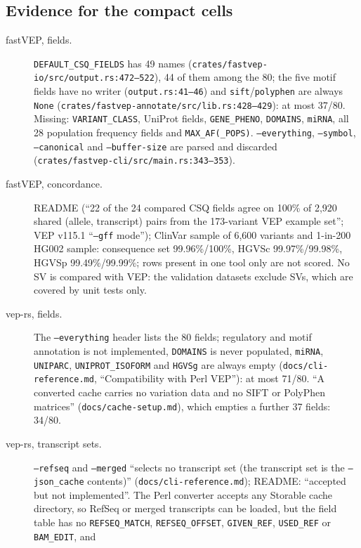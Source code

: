 \documentclass[11pt]{article}
\begin{document}
\subsection*{Evidence for the compact cells}
{\small\sloppy
\begin{description}
\item[fastVEP, fields.] \texttt{DEFAULT\_CSQ\_FIELDS} has 49 names
  (\texttt{crates/fastvep-io/src/output.rs:472--522}), 44 of them among the
  80; the five motif fields have no writer (\texttt{output.rs:41--46}) and
  \texttt{sift}/\texttt{polyphen} are always \texttt{None}
  (\texttt{crates/fastvep-annotate/src/lib.rs:428--429}): at most 37/80.
  Missing: \texttt{VARIANT\_CLASS}, UniProt fields, \texttt{GENE\_PHENO},
  \texttt{DOMAINS}, \texttt{miRNA}, all 28 population frequency fields and
  \texttt{MAX\_AF(\_POPS)}. \texttt{--everything}, \texttt{--symbol},
  \texttt{--canonical} and \texttt{--buffer-size} are parsed and discarded
  (\texttt{crates/fastvep-cli/src/main.rs:343--353}).
\item[fastVEP, concordance.] README (``22 of the 24 compared CSQ fields
  agree on 100\% of 2,920 shared (allele, transcript) pairs from the
  173-variant VEP example set''; VEP v115.1 ``\texttt{--gff} mode''); ClinVar
  sample of 6,600 variants and 1-in-200 HG002 sample: consequence set
  99.96\%/100\%, HGVSc 99.97\%/99.98\%, HGVSp 99.49\%/99.99\%; rows present
  in one tool only are not scored. No SV is compared with VEP: the
  validation datasets exclude SVs, which are covered by unit tests only.
\item[vep-rs, fields.] The \texttt{--everything} header lists the 80 fields;
  regulatory and motif annotation is not implemented, \texttt{DOMAINS} is
  never populated, \texttt{miRNA}, \texttt{UNIPARC},
  \texttt{UNIPROT\_ISOFORM} and \texttt{HGVSg} are always empty
  (\texttt{docs/cli-reference.md}, ``Compatibility with Perl VEP''): at most
  71/80. ``A converted cache carries no variation data and no SIFT or PolyPhen
  matrices'' (\texttt{docs/cache-setup.md}), which empties a further 37
  fields: 34/80.
\item[vep-rs, transcript sets.] \texttt{--refseq} and \texttt{--merged}
  ``selects no transcript set (the transcript set is the
  \texttt{--json\_cache} contents)'' (\texttt{docs/cli-reference.md}); README:
  ``accepted but not implemented''. The Perl converter accepts any Storable
  cache directory, so RefSeq or merged transcripts can be loaded, but the
  field table has no \texttt{REFSEQ\_MATCH}, \texttt{REFSEQ\_OFFSET},
  \texttt{GIVEN\_REF}, \texttt{USED\_REF} or \texttt{BAM\_EDIT}, and

\end{description}}
\end{document}
